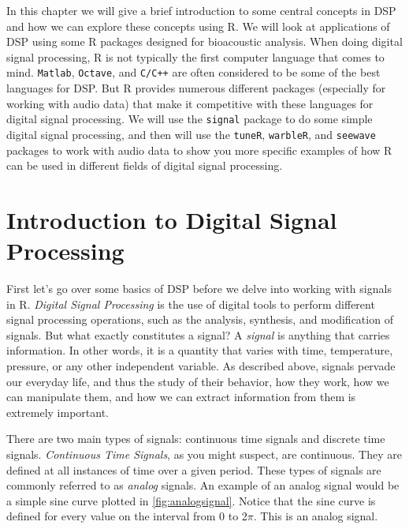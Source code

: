 \documentclass[
]{krantz}
\begin{document}
In this chapter we will give a brief introduction to some central concepts in DSP and how we can explore these concepts using R. We will look at applications of DSP using some R packages designed for bioacoustic analysis. When doing digital signal processing, R is not typically the first computer language that comes to mind. \texttt{Matlab}, \texttt{Octave}, and \texttt{C/C++} are often considered to be some of the best languages for DSP. But R provides numerous different packages (especially for working with audio data) that make it competitive with these languages for digital signal processing. We will use the \texttt{signal} package to do some simple digital signal processing, and then will use the \texttt{tuneR}, \texttt{warbleR}, and \texttt{seewave} packages to work with audio data to show you more specific examples of how R can be used in different fields of digital signal processing.

\hypertarget{introduction-to-digital-signal-processing}{%
\section{Introduction to Digital Signal Processing}\label{introduction-to-digital-signal-processing}}

First let's go over some basics of DSP before we delve into working with signals in R. \emph{Digital Signal Processing} is the use of digital tools to perform different signal processing operations, such as the analysis, synthesis, and modification of signals. But what exactly constitutes a signal? A \emph{signal} is anything that carries information. In other words, it is a quantity that varies with time, temperature, pressure, or any other independent variable. As described above, signals pervade our everyday life, and thus the study of their behavior, how they work, how we can manipulate them, and how we can extract information from them is extremely important.

There are two main types of signals: continuous time signals and discrete time signals. \emph{Continuous Time Signals}, as you might suspect, are continuous. They are defined at all instances of time over a given period. These types of signals are commonly referred to as \emph{analog} signals. An example of an analog signal would be a simple sine curve plotted in \ref{fig:analogsignal}. Notice that the sine curve is defined for every value on the interval from 0 to 2\(\pi\). This is an analog signal.
\end{document}
